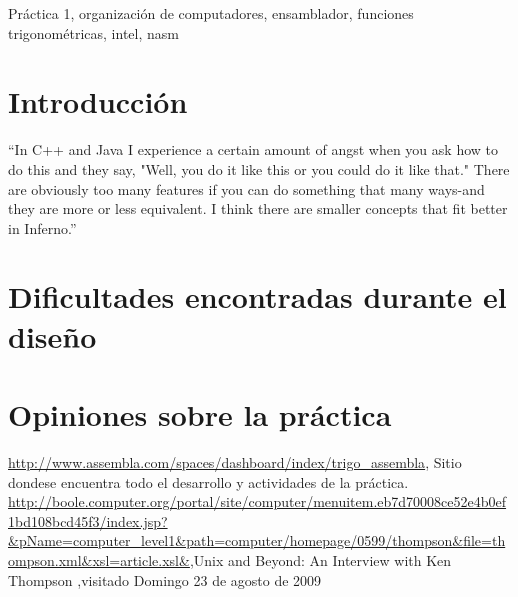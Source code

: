 \documentclass[%
	final,
	notitlepage,
	narroweqnarray,
	inline,
	twoside,
	]{ieee}
\begin{document}
\begin{keywords}
Práctica 1, organización de computadores, ensamblador, funciones trigonométricas, intel, nasm
\end{keywords}

\section{Introducción}
``In C++ and Java I experience a certain amount of angst when you ask how to do this and they say, "Well, you do it like this or you could do it like that." There are obviously too many features if you can do something that many ways-and they are more or less equivalent. I think there are smaller concepts that fit better in Inferno.''\cite{cita-thompson}





\section{Dificultades encontradas durante el diseño}


 
\section{Opiniones sobre la práctica}






\begin{thebibliography}{2}

\newblock \url{http://www.assembla.com/spaces/dashboard/index/trigo_assembla},
\newblock Sitio dondese encuentra todo el desarrollo y actividades de la práctica.
\newblock \url{http://boole.computer.org/portal/site/computer/menuitem.eb7d70008ce52e4b0ef1bd108bcd45f3/index.jsp?&pName=computer_level1&path=computer/homepage/0599/thompson&file=thompson.xml&xsl=article.xsl&},Unix and Beyond: An Interview with Ken Thompson ,visitado Domingo 23 de agosto de 2009
\end{thebibliography}

\end{document}
